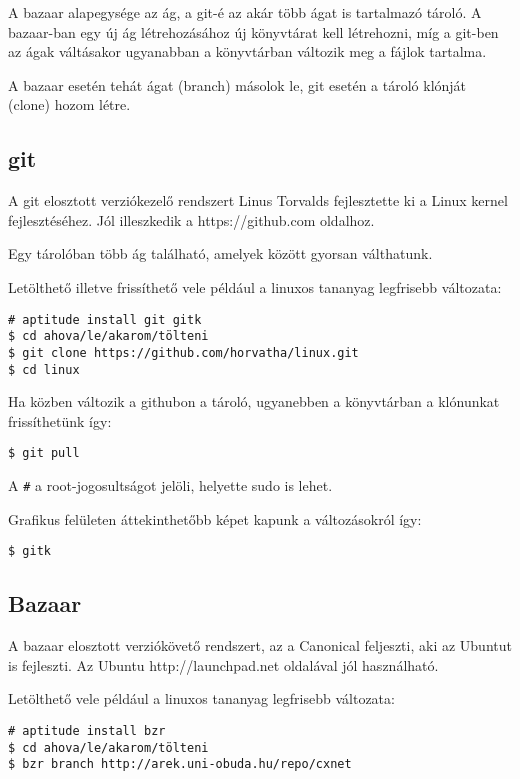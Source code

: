 \documentclass[a4paper]{article}
\begin{document}
A bazaar alapegysége az ág, a git-é az akár több ágat is
tartalmazó tároló. A bazaar-ban egy új ág létrehozásához új könyvtárat
kell létrehozni, míg a git-ben az ágak váltásakor ugyanabban a
könyvtárban változik meg a fájlok tartalma.

A bazaar esetén tehát ágat (branch) másolok le, git esetén a tároló
klónját (clone) hozom létre.


\subsection{git}
A git elosztott verziókezelő rendszert Linus Torvalds fejlesztette ki a
Linux kernel fejlesztéséhez. Jól illeszkedik a https://github.com
oldalhoz.

Egy tárolóban több ág található, amelyek között gyorsan
válthatunk.

Letölthető illetve frissíthető vele például a linuxos tananyag
legfrisebb változata:

\begin{Verbatim}
# aptitude install git gitk
$ cd ahova/le/akarom/tölteni
$ git clone https://github.com/horvatha/linux.git
$ cd linux
\end{Verbatim}

Ha közben változik a githubon a tároló, ugyanebben a könyvtárban a
klónunkat frissíthetünk így:

\begin{Verbatim}
$ git pull
\end{Verbatim}

A \verb"#" a root-jogosultságot jelöli, helyette sudo is lehet.

Grafikus felületen áttekinthetőbb képet kapunk a változásokról így:
\begin{Verbatim}
$ gitk
\end{Verbatim}

\subsection{Bazaar}
\label{seq:bazaar}
A bazaar elosztott verziókövető rendszert, az a Canonical feljeszti, aki
az Ubuntut is fejleszti. Az Ubuntu http://launchpad.net oldalával jól használható.

Letölthető vele például a linuxos tananyag legfrisebb változata:

\begin{Verbatim}
# aptitude install bzr
$ cd ahova/le/akarom/tölteni
$ bzr branch http://arek.uni-obuda.hu/repo/cxnet
\end{Verbatim}
\end{document}

